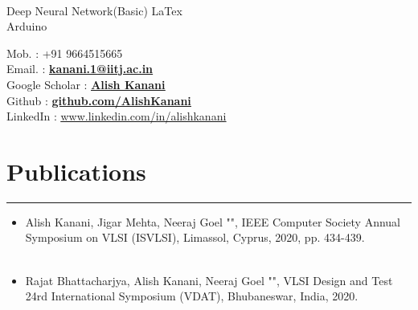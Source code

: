 \documentclass[]{resume}
\begin{document}
\begin{minipage}[t]{0.3\textwidth}
\vspace{-0.5em}
\\
Deep Neural Network(Basic)
LaTex\\
Arduino\\
\sectionsep
\end{minipage}
\hfill
\begin{minipage}[t]{0.69\textwidth} 
\hspace*{1pt}\hfill Mob. : +91 9664515665\\ 
\hspace*{1pt}\hfill Email. : \textbf{\href{mailto:kanani.1@iitj.ac.in}{\underline{kanani.1@iitj.ac.in}}}\\
\hspace*{1pt}\hfill Google Scholar : \textbf{\href{http://alishkanani.github.io}{\underline{Alish Kanani}}} \\
\hspace*{1pt}\hfill Github : \textbf{\href{https://github.com/AlishKanani}{\underline{github.com/AlishKanani}}}\\
\hspace*{1pt}\hfill LinkedIn : {\href{https://www.linkedin.com/in/alishkanani}{\underline{www.linkedin.com/in/alishkanani}}} \\
\vspace{-2.5em}

\section{Publications}
\vspace{-0.5em}
\noindent\rule{13cm}{0.4pt}
\vspace{-0.7em}
\runsubsection{}
\begin{itemize}
    \item Alish Kanani, Jigar Mehta, Neeraj Goel "", IEEE Computer Society Annual Symposium on VLSI (ISVLSI), Limassol, Cyprus, 2020, pp. 434-439. {\href{https://doi.org/10.1109/ISVLSI49217.2020.00085}{\underline{}}}\\
    \vspace{-2.6em}\\
    \item Rajat Bhattacharjya, Alish Kanani, Neeraj Goel "", VLSI Design and Test 24rd International Symposium (VDAT), Bhubaneswar, India, 2020.\\
\end{itemize}
\sectionsep
\vspace{-2.7em}


\end{minipage}
\end{document}
